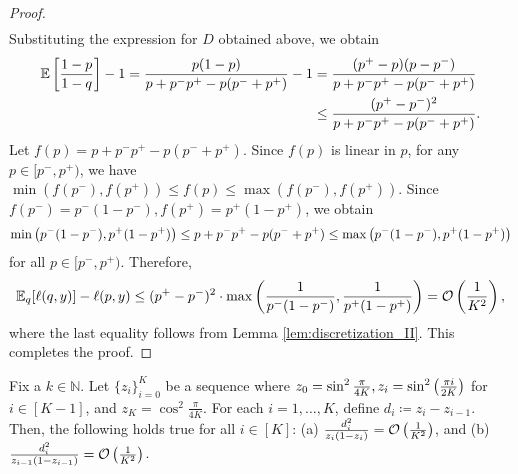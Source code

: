 \begin{proof}
\begin{align*}
    \end{align*}
    Substituting the expression for $D$ obtained above, we obtain \begin{align*}
        \mathbb{E}\left[ \frac{1 - p}{1 - q} \right] - 1 = \frac{p(1 - p)}{p + p^{-}p^{+} - p(p^{-} + p^{+})} - 1 &= \frac{(p^{+} - p)(p - p^{-})}{p + p^{-}p^{+} - p(p^{-} + p^{+})} \\ &\le \frac{(p^{+} - p^{-}) ^ {2}}{p + p^{-}p^{+} - p(p^{-} + p^{+})}.
    \end{align*}
    Let $f(p) = p + p^{-}p^{+} - p(p^{-} + p^{+})$. Since $f(p)$ is linear in $p$, for any $p \in [p^{-}, p^{+})$, we have $\min(f(p^{-}), f(p^{+})) \le f(p) \le \max(f(p^{-}), f(p^{+}))$. Since $f(p^{-}) = p^{-}(1 - p^{-}), f(p^{+}) = p^{+}(1 - p^{+})$, we obtain \begin{align*}
        \min\left( p^{-}(1 - p^{-}), p^{+}(1 - p^{+}) \right) \le p + p^{-}p^{+} - p(p^{-} + p^{+}) \le \max\left( p^{-}(1 - p^{-}), p^{+}(1 - p^{+}) \right)
    \end{align*}
    for all $p \in [p^{-}, p^{+})$. Therefore, \begin{align*}
        \mathbb{E}_{q}[\ell(q, y)] - \ell(p, y) \le (p^{+} - p^{-}) ^ {2} \cdot \max\left( \frac{1}{p^{-}(1 - p^{-})}, \frac{1}{p^{+}(1 - p^{+})} \right) = \mathcal{O}\left( \frac{1}{K ^ {2}} \right),
    \end{align*}
    where the last equality follows from Lemma \ref{lem:discretization_II}. This completes the proof.
\end{proof}
\begin{lemma}\label{lem:discretization_II}
Fix a $k \in \mathbb{N}$. Let $\{z_{i}\}_{i = 0} ^ {K}$ be a sequence where $z_{0} = \sin ^ {2} \frac{\pi}{4K}, z_{i} = \sin ^ {2} \left( \frac{\pi i}{2K} \right)$ for $i \in [K - 1]$, and $z_{K} = \cos ^ 2 \frac{\pi}{4K}$. For each $i = 1, \dots, K$, define $d_{i} \coloneqq z_{i} - z_{i - 1}$. Then, the following holds true for all $i \in [K]$: (a) $\frac{d_{i} ^ {2}}{z_{i}(1 - z_{i})} = \mathcal{O}\left( \frac{1}{K ^ {2}} \right)$, and (b) $\frac{d_{i} ^ {2}}{z_{i - 1}(1 - z_{i - 1})} = \mathcal{O}\left( \frac{1}{K ^ {2}} \right)$.
\end{lemma}
